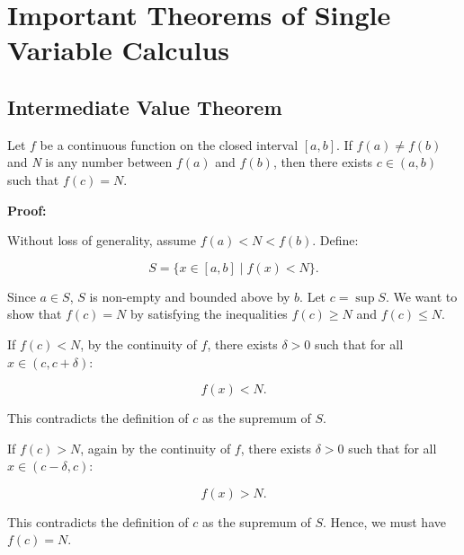 \chapter{Important Theorems of Single Variable Calculus}

\section{Intermediate Value Theorem}

Let \(f\) be a continuous function on the closed interval \([a, b]\). If \( f(a) \ne f(b) \) 
and \emph{N} is any number between \( f(a) \) and \( f(b) \), then there exists \( c \in (a, b) \) 
such that \( f(c) = N \).

\textbf{Proof:}  

Without loss of generality, assume \( f(a) < N < f(b) \).  
Define:

\[
    S = \{ x \in [a, b] \mid f(x) < N \}.
\]

Since \( a \in S \), \(S\) is non-empty and bounded above by \(b\). Let \( c = \sup S \). We want 
to show that \( f(c) = N \) by satisfying the inequalities \(f(c) \ge N\) and \(f(c) \le N\).

If \(f(c) < N\), by the continuity of \(f\), there exists \( \delta > 0 \) such that for all \( x \in (c, c + \delta) \):

\[
    f(x) < N.
\]

This contradicts the definition of \( c \) as the supremum of \( S \).

If \(f(c) > N\), again by the continuity of \(f\), there exists \( \delta > 0 \) such that for all \( x \in (c - \delta, c) \): 

\[
    f(x) > N.
\]

This contradicts the definition of \( c \) as the supremum of \( S \). Hence, we must have \( f(c) = N \).

\QED

\begin{center}
\end{center}

